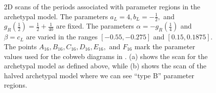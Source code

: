 \begin{figure}
	\centering
	\caption[2D scans of the periods associated with parameter regions in the archetypal model]{
		2D scans of the periods associated with parameter regions in the archetypal model.
		The parameters $a_L = 4, b_L = -\frac{1}{2},$ and $g_R\left(\frac{1}{2}\right) = \frac{1}{2} + \frac{1}{40}$ are fixed.
		The parameters $\alpha = -g_R\left(\frac{1}{4}\right)$ and $\beta = c_L$ are varied in the ranges $[-0.55, -0.275]$ and $[0.15, 0.1875]$.
		The points $A_{16}, B_{16}, C_{16}, D_{16}, E_{16},$ and $F_{16}$ mark the parameter values used for the cobweb diagrams in .
		(a) shows the scan for the archetypal model as defined above, while (b) shows the scan of the halved archetypal model where we can see ``type B'' parameter regions. }
	\label{fig:arch.dyn.period}
\end{figure}

